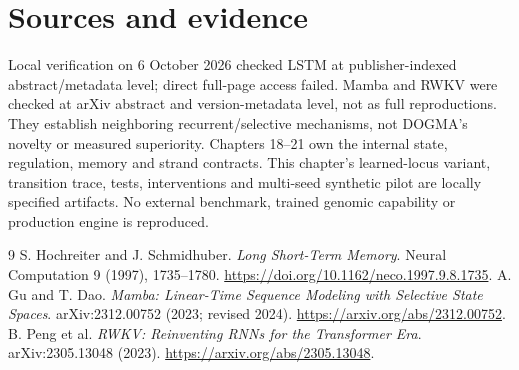 \clearpage
\section*{Sources and evidence}
Local verification on 6 October 2026 checked LSTM at publisher-indexed
abstract/metadata level; direct full-page access failed. Mamba and RWKV were
checked at arXiv abstract and version-metadata level, not as full reproductions.
They establish neighboring recurrent/selective mechanisms, not DOGMA's novelty
or measured superiority. Chapters 18--21 own the internal state, regulation,
memory and strand contracts. This chapter's learned-locus variant, transition
trace, tests, interventions and multi-seed synthetic pilot are locally specified
artifacts. No external benchmark, trained genomic capability or production
engine is reproduced.
\begingroup\let\chapter\section
\begin{thebibliography}{9}
 S. Hochreiter and J. Schmidhuber.
\emph{Long Short-Term Memory}. Neural Computation 9 (1997), 1735--1780.
\url{https://doi.org/10.1162/neco.1997.9.8.1735}.
 A. Gu and T. Dao.
\emph{Mamba: Linear-Time Sequence Modeling with Selective State Spaces}.
arXiv:2312.00752 (2023; revised 2024).
\url{https://arxiv.org/abs/2312.00752}.
 B. Peng et al.
\emph{RWKV: Reinventing RNNs for the Transformer Era}.
arXiv:2305.13048 (2023).
\url{https://arxiv.org/abs/2305.13048}.
\end{thebibliography}\endgroup
